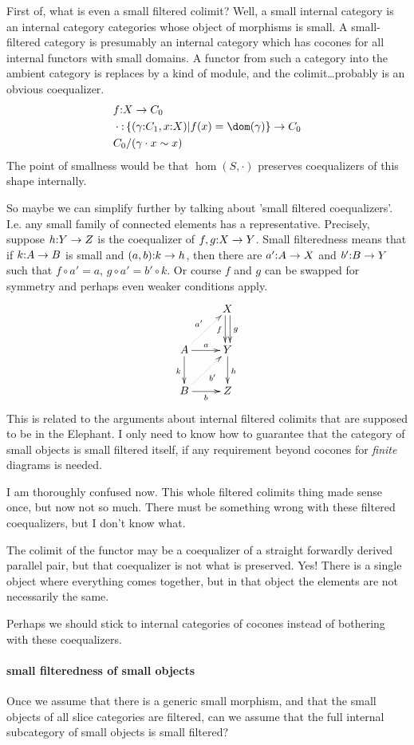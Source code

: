 \documentclass[csh.tex]{subfiles}
\begin{document}
First of, what is even a small filtered colimit?
Well, a small internal category is an internal category categories whose object of morphisms is small. A small-filtered category is presumably an internal category which has cocones for all internal functors with small domains. A functor from such a category into the ambient category is replaces by a kind of module, and the colimit\dots probably is an obvious coequalizer.
\begin{align*}
&f\of X\to C_0\\
&\cdot\of \set{(\gamma\of C_1,x\of X)| f(x) = \dom(\gamma)}\to C_0\\
&C_0/(\gamma\cdot x \sim x)
\end{align*}
The point of smallness would be that $\hom(S,\cdot)$ preserves coequalizers of this shape internally.

So maybe we can simplify further by talking about 'small filtered coequalizers'. I.e. any small family of connected elements has a representative. Precisely, suppose $h\mathord : Y\to Z$ is the coequalizer of $f,g\mathord : X\to Y$. Small filteredness means that if $k\mathord : A\to B$ is small and $(a,b)\mathord : k\to h$, then there are $a'\mathord : A\to X$ and $b'\mathord : B\to Y$ such that $f\circ a' = a$, $g\circ a' = b'\circ k$. Or course $f$ and $g$ can be swapped for symmetry and perhaps even weaker conditions apply.
\[\xymatrix{
& X \ar@<-.5ex>[d]_f \ar@<.5ex>[d]^g \\
A \ar[r]^a \ar@{.>}[ur]^{a'}\ar[d]_k & Y\ar[d]^h \\
B \ar[r]_b \ar@{.>}[ur]_{b'} & Z
}\]
This is related to the arguments about internal filtered colimits that are supposed to be in the Elephant. I only need to know how to guarantee that the category of small objects is small filtered itself, if any requirement beyond cocones for \emph{finite} diagrams is needed.

I am thoroughly confused now. This whole filtered colimits thing made sense once, but now not so much. There must be something wrong with these filtered coequalizers, but I don't know what.

The colimit of the functor may be a coequalizer of a straight forwardly derived parallel pair, but that coequalizer is not what is preserved.
Yes! There is a single object where everything comes together, but in that object the elements are not necessarily the same.

Perhaps we should stick to internal categories of cocones instead of bothering with these coequalizers.

\paragraph{small filteredness of small objects}
Once we assume that there is a generic small morphism, and that the small objects of all slice categories are filtered, can we assume that the full internal subcategory of small objects is small filtered?
\end{document}
